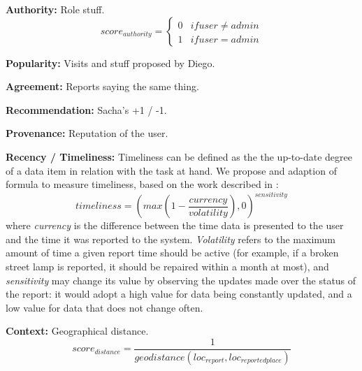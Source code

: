 \textbf{Authority:} Role stuff.
\begin{equation}
score_{authority} = \left\{\begin{matrix}
0 & if user \neq admin \\
1 & if user = admin
\end{matrix}\right.
\end{equation}

\textbf{Popularity:} Visits and stuff proposed by Diego.

\textbf{Agreement:} Reports saying the same thing.

\textbf{Recommendation:} Sacha's +1 / -1.

\textbf{Provenance:} Reputation of the user.

\textbf{Recency / Timeliness:} Timeliness can be defined as the the up-to-date degree of a data item in relation with the task at hand. We propose and adaption of \cite{Hartig09usingweb} formula to measure timeliness, based on the work described in \cite{Ballou:1998:MIM:291329.291335}:
%
\begin{equation}
    timeliness = (max(1-\frac{currency}{volatility}), 0)^{sensitivity}
\end{equation}
%
where \emph{currency} is the difference between the time data is presented to the user and the time it was reported to the system. \emph{Volatility} refers to the maximum amount of time a given report time should be active (for example, if a broken street lamp is reported, it should be repaired within a month at most), and \emph{sensitivity} may change its value by observing the updates made over the status of the report: it would adopt a high value for data being constantly updated, and a low value for data that does not change often.

\textbf{Context:} Geographical distance.
\begin{equation}
score_{distance} = \frac{1}{geodistance(loc_{report}, loc_{reportedplace})}
\end{equation}